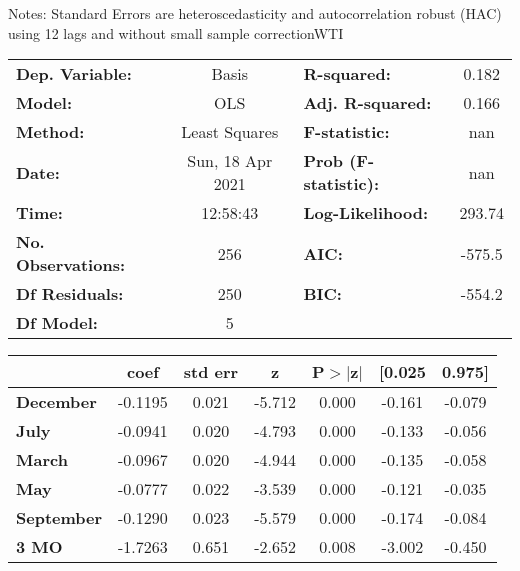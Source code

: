 Notes: \newline
 [1] Standard Errors are heteroscedasticity and autocorrelation robust (HAC) using 12 lags and without small sample correctionWTI\begin{center}
\begin{tabular}{lclc}
\toprule
\textbf{Dep. Variable:}    &      Basis       & \textbf{  R-squared:         } &     0.182   \\
\textbf{Model:}            &       OLS        & \textbf{  Adj. R-squared:    } &     0.166   \\
\textbf{Method:}           &  Least Squares   & \textbf{  F-statistic:       } &       nan   \\
\textbf{Date:}             & Sun, 18 Apr 2021 & \textbf{  Prob (F-statistic):} &      nan    \\
\textbf{Time:}             &     12:58:43     & \textbf{  Log-Likelihood:    } &    293.74   \\
\textbf{No. Observations:} &         256      & \textbf{  AIC:               } &    -575.5   \\
\textbf{Df Residuals:}     &         250      & \textbf{  BIC:               } &    -554.2   \\
\textbf{Df Model:}         &           5      & \textbf{                     } &             \\
\bottomrule
\end{tabular}
\begin{tabular}{lcccccc}
                   & \textbf{coef} & \textbf{std err} & \textbf{z} & \textbf{P$> |$z$|$} & \textbf{[0.025} & \textbf{0.975]}  \\
\midrule
\textbf{December}  &      -0.1195  &        0.021     &    -5.712  &         0.000        &       -0.161    &       -0.079     \\
\textbf{July}      &      -0.0941  &        0.020     &    -4.793  &         0.000        &       -0.133    &       -0.056     \\
\textbf{March}     &      -0.0967  &        0.020     &    -4.944  &         0.000        &       -0.135    &       -0.058     \\
\textbf{May}       &      -0.0777  &        0.022     &    -3.539  &         0.000        &       -0.121    &       -0.035     \\
\textbf{September} &      -0.1290  &        0.023     &    -5.579  &         0.000        &       -0.174    &       -0.084     \\
\textbf{3 MO}      &      -1.7263  &        0.651     &    -2.652  &         0.008        &       -3.002    &       -0.450     \\

\end{tabular}
\end{center}

